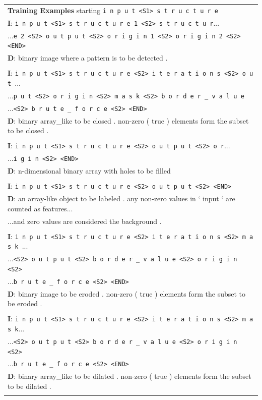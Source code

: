 \begin{table}
\begin{center}
{\begin{tabular}{l}
\textbf{Training Examples} starting \texttt{i n p u t <S1> s t r u c t u r e}\\
\textbf{I}: \texttt{i n p u t <S1> s t r u c t u r e 1 <S2> s t r u c t u r}...\\
...\texttt{e 2 <S2> o u t p u t <S2> o r i g i n 1 <S2> o r i g i n 2 <S2> <END>}\\
\textbf{D}: binary image where a pattern is to be detected .\\
\\
\textbf{I}: \texttt{i n p u t <S1> s t r u c t u r e <S2> i t e r a t i o n s <S2> o u t }...\\
...\texttt{p u t <S2> o r i g i n <S2> m a s k <S2> b o r d e r _ v a l u e }\\
...\texttt{<S2> b r u t e _ f o r c e <S2> <END>}\\
\textbf{D}: binary array\_like to be closed . non-zero ( true ) elements form the subset to be closed .\\
\\
\textbf{I}: \texttt{i n p u t <S1> s t r u c t u r e <S2> o u t p u t <S2> o r}...\\
...\texttt{i g i n <S2> <END>}\\
\textbf{D}: n-dimensional binary array with holes to be filled\\
\\
\textbf{I}: \texttt{i n p u t <S1> s t r u c t u r e <S2> o u t p u t <S2> <END>}\\
\textbf{D}: an array-like object to be labeled . any non-zero values in ` input ` are counted as features...\\
...and zero values are considered the background .\\
\\
\textbf{I}: \texttt{i n p u t <S1> s t r u c t u r e <S2> i t e r a t i o n s <S2> m a s k }...\\
...\texttt{<S2> o u t p u t <S2> b o r d e r _ v a l u e <S2> o r i g i n <S2>}\\
...\texttt{b r u t e _ f o r c e <S2> <END>}\\
\textbf{D}: binary image to be eroded . non-zero ( true ) elements form the subset to be eroded .\\
\\
\textbf{I}: \texttt{i n p u t <S1> s t r u c t u r e <S2> i t e r a t i o n s <S2> m a s k}...\\
...\texttt{<S2> o u t p u t <S2> b o r d e r _ v a l u e <S2> o r i g i n <S2>}\\
...\texttt{b r u t e _ f o r c e <S2> <END>}\\
\textbf{D}: binary array\_like to be dilated . non-zero ( true ) elements form the subset to be dilated .\\
\\




\end{tabular}}
\end{center}
\end{table}

